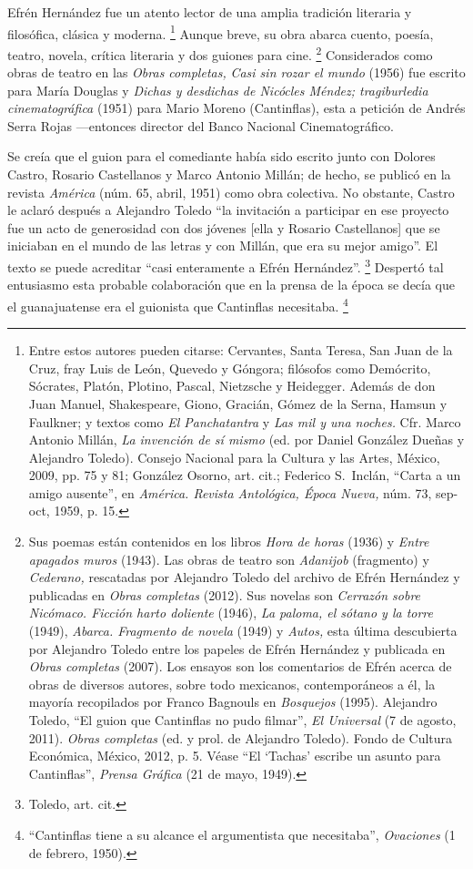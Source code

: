 \documentclass[14pt,twoside,final]{extbook} %
\let\oldfootnote\footnote
\renewcommand\footnote[1]{%
\oldfootnote{\hspace{1mm}#1}}
\newcommand{\nota}[1]{\marginpar{\color{blue}\tiny #1}}%
\begin{document}
Efrén Hernández fue un atento lector de una amplia tradición literaria y filosófica, clásica y moderna.\footnote{Entre estos autores pueden citarse: Cervantes, Santa Teresa, San Juan de la Cruz, fray Luis de León, Quevedo y Góngora; filósofos como Demócrito, Sócrates, Platón, Plotino, Pascal, Nietzsche y Heidegger. Además de don Juan Manuel, Shakespeare, Giono, Gracián, Gómez de la Serna, Hamsun y Faulkner; y textos como \emph{El Panchatantra} y \emph{Las mil y una noches.} Cfr. Marco Antonio Millán, \emph{La invención de sí mismo} (ed. por Daniel González Dueñas y Alejandro Toledo). Consejo Nacional para la Cultura y las Artes, México, 2009, pp. 75 y 81; González Osorno, art. cit.; Federico S.~Inclán, ``Carta a un amigo ausente'', en \emph{América. Revista Antológica, Época Nueva,} núm. 73, sep-oct, 1959, p. 15.} Aunque breve, su obra abarca cuento, poesía, teatro, novela, crítica literaria y dos guiones para cine.\footnote{Sus poemas están contenidos en los libros \emph{Hora de horas} (1936) y \emph{Entre apagados muros} (1943). Las obras de teatro son \emph{Adanijob} (fragmento) y \emph{Cederano,} rescatadas por Alejandro Toledo del archivo de Efrén Hernández y publicadas en \emph{Obras completas} (2012). Sus novelas son \emph{Cerrazón sobre Nicómaco. Ficción harto doliente} (1946), \emph{La paloma, el sótano y la torre} (1949), \emph{Abarca. Fragmento de novela} (1949) y \emph{Autos,} esta última descubierta por Alejandro Toledo entre los papeles de Efrén Hernández y publicada en \emph{Obras completas} (2007). Los ensayos son los comentarios de Efrén acerca de obras de diversos autores, sobre todo mexicanos, contemporáneos a él, la mayoría recopilados por Franco Bagnouls en \emph{Bosquejos} (1995). Alejandro Toledo, ``El guion que Cantinflas no pudo filmar'', \emph{El Universal} (7 de agosto, 2011). \emph{Obras completas} (ed. y prol. de Alejandro Toledo). Fondo de Cultura Económica, México, 2012, p. 5. Véase ``El `Tachas' escribe un asunto para Cantinflas'', \emph{Prensa Gráfica} (21 de mayo, 1949).} Considerados como obras de teatro en las \emph{Obras completas,} \emph{Casi sin rozar el mundo} (1956) fue escrito para María Douglas y \emph{Dichas y desdichas de Nicócles Méndez; tragiburledia cinematográfica} (1951) para Mario Moreno (Cantinflas), esta a petición de Andrés Serra Rojas ---entonces director del Banco Nacional Cinematográfico.

Se creía que el guion para el comediante había sido escrito junto con Dolores Castro, Rosario Castellanos y Marco Antonio Millán; de hecho, se publicó en la revista \emph{América} (núm. 65, abril, 1951) como obra colectiva. No obstante, Castro le aclaró después a Alejandro Toledo ``la invitación a participar en ese proyecto fue un acto de generosidad con dos jóvenes [ella y Rosario Castellanos] que se iniciaban en el mundo de las letras y con Millán, que era su mejor amigo''. El texto se puede acreditar ``casi enteramente a Efrén Hernández''.\footnote{Toledo, art. cit.} Despertó tal entusiasmo esta probable colaboración que en la prensa de la época se decía que el guanajuatense era el guionista que Cantinflas necesitaba.\footnote{``Cantinflas tiene a su alcance el argumentista que necesitaba'', \emph{Ovaciones} (1 de febrero, 1950).} %
\end{document}
